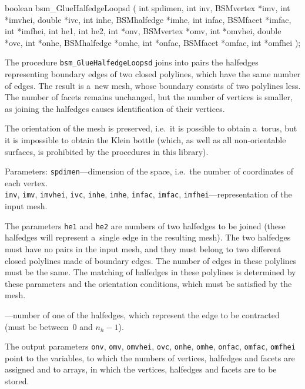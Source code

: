 \medskip
\begin{listingC}
boolean bsm_GlueHalfedgeLoopsd ( int spdimen,
                     int inv, BSMvertex *imv, int *imvhei, double *ivc,
                     int inhe, BSMhalfedge *imhe,
                     int infac, BSMfacet *imfac, int *imfhei,
                     int he1, int he2,
                     int *onv, BSMvertex *omv, int *omvhei,
                     double *ovc,
                     int *onhe, BSMhalfedge *omhe,
                     int *onfac, BSMfacet *omfac, int *omfhei );
\end{listingC}
The procedure \texttt{bsm\_GlueHalfedgeLoopsd} joins into pairs
the halfedges representing boundary edges of two closed polylines, which
have the same number of edges. The result is a~new mesh, whose boundary
consists of two polylines less. The number of facets remains unchanged, but
the number of vertices is smaller, as joining the halfedges causes
identification of their vertices.

The orientation of the mesh is preserved, i.e.\ it is possible to obtain
a~torus, but it is impossible to obtain the Klein bottle (which, as well as
all non-orientable surfaces, is prohibited by the procedures in this
library).

Parameters: \texttt{spdimen}---dimension of the space, i.e.\ the number of
coordinates of each vertex. \\
\texttt{inv}, \texttt{imv}, \texttt{imvhei}, \texttt{ivc}, \texttt{inhe},
\texttt{imhe}, \texttt{infac}, \texttt{imfac},
\texttt{imfhei}---representation of the input mesh.

The parameters \texttt{he1} and \texttt{he2} are numbers of two halfedges to
be joined (these halfedges will represent a~single edge in the resulting
mesh). The two halfedges must have no pairs in the input mesh, and they must
belong to two different closed polylines made of boundary edges. The number
of edges in these polylines must be the same. The matching of halfedges in
these polylines is determined by these parameters and the orientation
conditions, which must be satisfied by the mesh.

---number of one of the halfedges, which represent the edge to
be contracted (must be between~$0$ and $n_h-1$).

The output parameters \texttt{onv}, \texttt{omv}, \texttt{omvhei},
\texttt{ovc}, \texttt{onhe}, \texttt{omhe}, \texttt{onfac}, \texttt{omfac},
\texttt{omfhei} point to the variables, to which the numbers of vertices,
halfedges and facets are assigned and to arrays, in which the vertices,
halfedges and facets are to be stored.


